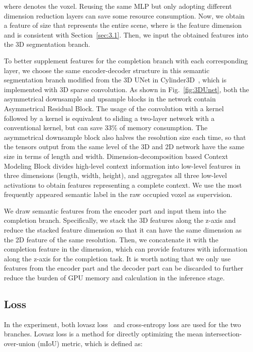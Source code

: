 \documentclass[letterpaper, 10 pt, conference]{ieeeconf}
\begin{document}
where  denotes the  voxel. Reusing the same MLP but only adopting different dimension reduction layers can save some resource consumption. Now, we obtain a feature of size  that represents the entire scene, where  is the feature dimension and is consistent with Section~\ref{sec:3.1}. Then, we input the obtained features into the 3D segmentation branch.

To better supplement features for the completion branch with each corresponding layer, we choose the same encoder-decoder structure in this semantic segmentation branch modified from the 3D UNet in Cylinder3D~\cite{zhou2020cylinder3d}, which is implemented with 3D sparse convolution.
As shown in Fig.~\ref{fig:3DUnet}, both the asymmetrical downsample and upsample blocks in the network contain Asymmetrical Residual Block. The usage of the convolution with a  kernel followed by a  kernel is equivalent to sliding a two-layer network with a conventional  kernel, but can save 33\% of memory consumption. The asymmetrical downsample block also halves the resolution size each time, so that the tensors output from the same level of the 3D and 2D network have the same size in terms of length and width. 
Dimension-decomposition based Context Modeling Block divides high-level context information into low-level features in three dimensions (length, width, height), and aggregates all three low-level activations to obtain features representing a complete context. We use the most frequently appeared semantic label in the raw occupied voxel as supervision.

We draw semantic features from the encoder part and input them into the completion branch. Specifically, we stack the 3D features along the z-axis and reduce the stacked feature dimension so that it can have the same dimension  as the 2D feature of the same resolution. Then, we concatenate it with the completion feature in the  dimension, which can provide features with information along the z-axis for the completion task. It is worth noting that we only use features from the encoder part and the decoder part can be discarded to further reduce the burden of GPU memory and calculation in the inference stage.


\subsection{Loss}
In the experiment, both lovasz loss~\cite{berman2018lovasz} and cross-entropy loss are used for the two branches. Lovasz loss is a method for directly optimizing the mean intersection-over-union (mIoU) metric, which is defined as: 
\end{document}
